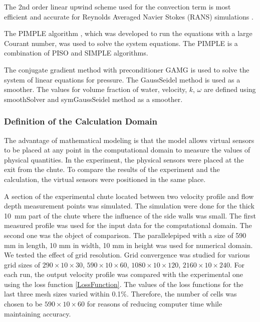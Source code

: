 \documentclass[mathematics,article,submit,pdftex,moreauthors]{Definitions/mdpi}
\begin{document}
The 2nd order linear upwind scheme used for the convection term is most efficient and accurate for Reynolds Averaged Navier Stokes (RANS) simulations \cite{ROBERTSON2015122}.

The PIMPLE algorithm \cite{Holzmann2019, Yin2003}, which was developed to run the equations with a large Courant number, was used to solve the system equations. The PIMPLE is a combination of PISO \cite{Issa1986_2} and SIMPLE \cite{Issa1986_1} algorithms.

%

The conjugate gradient method with preconditioner GAMG is used to solve the system of linear equations for pressure. The GaussSeidel method is used as a smoother. The values for volume fraction of water, velocity, $k$, $\omega$ are defined using smoothSolver and  symGaussSeidel method as a smoother. 

\subsubsection{Definition of the Calculation Domain}

The advantage of mathematical modeling is that the model allows virtual sensors to be placed at any point in the computational domain to measure the values of physical quantities. In the experiment, the physical sensors were placed at the exit from the chute. To compare the results of the experiment and the calculation, the virtual sensors were positioned in the same place.

A section of the experimental chute located between two velocity profile and flow depth measurement points was simulated. 
The simulation were done for the thick  10~mm part of the chute where the influence of the side walls was small.
The first measured profile was used for the input data for the computational domain. The second one was the object of comparison. 
%
The parallelepiped with a size of 590 mm in length, 10 mm in width, 10 mm in height was used for numerical domain.
%
We tested the effect of grid resolution. Grid convergence was studied for various grid sizes of $290 \times 10 \times 30$, $590 \times 10 \times 60$, $1080 \times 10 \times 120$, $2160 \times 10 \times 240$. For each run, the output velocity profile was compared with the experimental one using the loss function \ref{LossFunction}. The values of the loss functions for the last three mesh sizes varied within 0.1\%. Therefore, the number of cells was chosen to be $590 \times 10 \times 60$ for reasons of reducing computer time while maintaining accuracy.
\end{document}
